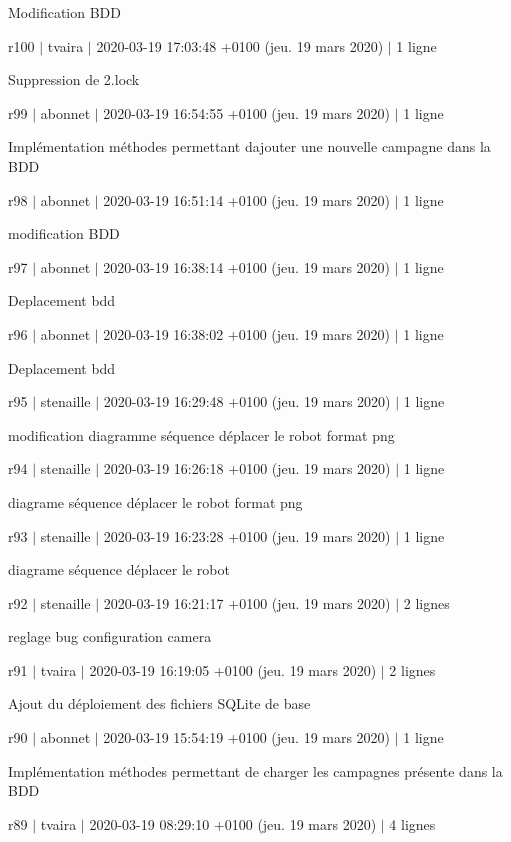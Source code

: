 Modification B\+DD

r100 $\vert$ tvaira $\vert$ 2020-\/03-\/19 17\+:03\+:48 +0100 (jeu. 19 mars 2020) $\vert$ 1 ligne

Suppression de 2.\+lock

r99 $\vert$ abonnet $\vert$ 2020-\/03-\/19 16\+:54\+:55 +0100 (jeu. 19 mars 2020) $\vert$ 1 ligne

Implémentation méthodes permettant d\textquotesingle{}ajouter une nouvelle campagne dans la B\+DD

r98 $\vert$ abonnet $\vert$ 2020-\/03-\/19 16\+:51\+:14 +0100 (jeu. 19 mars 2020) $\vert$ 1 ligne

modification B\+DD

r97 $\vert$ abonnet $\vert$ 2020-\/03-\/19 16\+:38\+:14 +0100 (jeu. 19 mars 2020) $\vert$ 1 ligne

Deplacement bdd

r96 $\vert$ abonnet $\vert$ 2020-\/03-\/19 16\+:38\+:02 +0100 (jeu. 19 mars 2020) $\vert$ 1 ligne

Deplacement bdd

r95 $\vert$ stenaille $\vert$ 2020-\/03-\/19 16\+:29\+:48 +0100 (jeu. 19 mars 2020) $\vert$ 1 ligne

modification diagramme séquence déplacer le robot format png

r94 $\vert$ stenaille $\vert$ 2020-\/03-\/19 16\+:26\+:18 +0100 (jeu. 19 mars 2020) $\vert$ 1 ligne

diagrame séquence déplacer le robot format png

r93 $\vert$ stenaille $\vert$ 2020-\/03-\/19 16\+:23\+:28 +0100 (jeu. 19 mars 2020) $\vert$ 1 ligne

diagrame séquence déplacer le robot

r92 $\vert$ stenaille $\vert$ 2020-\/03-\/19 16\+:21\+:17 +0100 (jeu. 19 mars 2020) $\vert$ 2 lignes

reglage bug configuration camera

r91 $\vert$ tvaira $\vert$ 2020-\/03-\/19 16\+:19\+:05 +0100 (jeu. 19 mars 2020) $\vert$ 2 lignes

Ajout du déploiement des fichiers S\+Q\+Lite de base

r90 $\vert$ abonnet $\vert$ 2020-\/03-\/19 15\+:54\+:19 +0100 (jeu. 19 mars 2020) $\vert$ 1 ligne

Implémentation méthodes permettant de charger les campagnes présente dans la B\+DD

r89 $\vert$ tvaira $\vert$ 2020-\/03-\/19 08\+:29\+:10 +0100 (jeu. 19 mars 2020) $\vert$ 4 lignes

